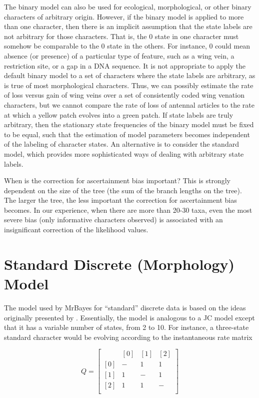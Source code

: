 \documentclass[12pt]{book}
\begin{document}
The binary model can also be used for ecological, morphological, or other binary
characters of arbitrary origin. However, if the binary model is applied to more than one
character, then there is an implicit assumption that the state labels are not arbitrary for
those characters. That is, the 0 state in one character must somehow be comparable to the
0 state in the others. For instance, 0 could mean absence (or presence) of a particular type
of feature, such as a wing vein, a restriction site, or a gap in a DNA sequence. It is not
appropriate to apply the default binary model to a set of characters where the state labels
are arbitrary, as is true of most morphological characters. Thus, we can possibly estimate
the rate of loss versus gain of wing veins over a set of consistently coded wing venation
characters, but we cannot compare the rate of loss of antennal articles to the rate at which
a yellow patch evolves into a green patch. If state labels are truly arbitrary, then the
stationary state frequencies of the binary model must be fixed to be equal, such that the
estimation of model parameters becomes independent of the labeling of character states.
An alternative is to consider the standard model, which provides more sophisticated ways
of dealing with arbitrary state labels.

When is the correction for ascertainment bias important? This is strongly dependent on
the size of the tree (the sum of the branch lengths on the tree). The larger the tree, the less
important the correction for ascertainment bias becomes. In our experience, when there
are more than 20-30 taxa, even the most severe bias (only informative characters
observed) is associated with an insignificant correction of the likelihood values.

\section{Standard Discrete (Morphology) Model}
The model used by MrBayes for ``standard'' discrete data is based on the ideas originally
presented by \citet{lewis01}. Essentially, the model is analogous to a JC model except that
it has a variable number of states, from 2 to 10. For instance, a three-state standard
character would be evolving according to the instantaneous rate matrix

\[
Q=\begin{bmatrix}
    & [0] & [1] & [2]\\ 
 [0]& - & 1 & 1\\ 
 [1]& 1& -  & 1\\ 
 [2]& 1& 1  & -\\ 
\end{bmatrix}
\]
\end{document}
